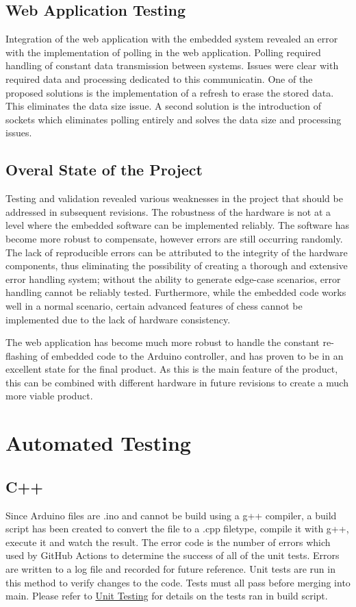 \documentclass[12pt, titlepage]{article}
\begin{document}
\subsection{Web Application Testing}
Integration of the web application with the embedded system revealed an error 
with the implementation of polling in the web application. Polling required 
handling of constant data transmission between systems. Issues were clear with 
required data and processing dedicated to this communicatin. One of the proposed
solutions is the implementation of a refresh to erase the stored data. This 
eliminates the data size issue. A second solution is the introduction of sockets
which eliminates polling entirely and solves the data size and processing issues. 

\subsection{Overal State of the Project}
Testing and validation revealed various weaknesses in the project that should be addressed
in subsequent revisions. The robustness of the hardware is not at a level where the embedded
software can be implemented reliably. The software has become more robust to compensate,
however errors are still occurring randomly. The lack of reproducible errors can be attributed
to the integrity of the hardware components, thus eliminating the possibility of creating
a thorough and extensive error handling system; without the ability to generate edge-case
scenarios, error handling cannot be reliably tested. Furthermore, while the embedded code 
works well in a normal scenario, certain advanced features of chess cannot be implemented due
to the lack of hardware consistency. 

The web application has become much more robust to handle the constant re-flashing of
embedded code to the Arduino controller, and has proven to be in an excellent state for
the final product. As this is the main feature of the product, this can be combined with
different hardware in future revisions to create a much more viable product.

\section{Automated Testing}
\subsection{C++}
  Since Arduino files are .ino and cannot be build using a g++ compiler, a build script has been created to convert the file to a .cpp filetype, compile it with
  g++, execute it and watch the result. The error code is the number of errors which used by GitHub Actions to determine the success of all of the unit tests. Errors
  are written to a log file and recorded for future reference. Unit tests are run in this method to verify changes to the code. Tests must all pass before merging
  into main. Please refer to \hyperref[UnitTest]{Unit Testing} for details on the tests ran in build script.
\end{document}
